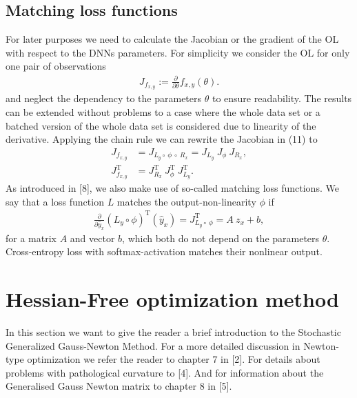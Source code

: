 \documentclass[conference]{IEEEtran}
\begin{document}
	\subsection{Matching loss functions}
	For later purposes we need to calculate the Jacobian or the gradient of the OL with respect to the DNNs parameters. For simplicity we consider the OL for only one pair of observations
	\begin{align}
	J_{f_{x, y}} := \frac{\partial}{\partial\theta}f_{x, y}(\theta).
	\end{align}
	and neglect the dependency to the parameters $\theta$ to ensure readability.
	The results can be extended without problems to a case where the whole data set or a batched version of the whole data set is considered due to linearity of the derivative.
	Applying the chain rule we can rewrite the Jacobian in (11) to
	\begin{align}
	J_{f_{x, y}} &= J_{L_{y}\circ \:\phi \:\circ\:R_{x}} = J_{L_{y}} \: J_{\phi} \: J_{R_{x}},\\
	J_{f_{x, y}}^{\mathrm{T}} &= J_{R_{x}}^{\mathrm{T}} \: J_{\phi}^{\mathrm{T}} \: J_{L_{y}}^{\mathrm{T}}.
	\end{align}
	As introduced in [8], we also make use of so-called matching loss functions. We say that a loss function $L$ matches the output-non-linearity $\phi$ if
	\begin{align}
	\frac{\partial}{\partial\hat{y}_{x}}\left(L_{y}\circ \phi\right)^{\mathrm{T}}(\hat{y}_{x})= J_{L_{y}\circ \:\phi}^{\mathrm{T}} = A\: z_{x} + b,
	\end{align}
	for a matrix $A$ and vector $b$, which both do not depend on the parameters $\theta$.
	Cross-entropy loss with softmax-activation matches their nonlinear output. 
	
	
	\section{Hessian-Free optimization method}
	In this section we want to give the reader a brief introduction to the Stochastic Generalized Gauss-Newton Method. For a more detailed discussion in Newton-type optimization we refer the reader to chapter 7 in [2]. For details about problems with pathological curvature to [4]. And for information about the Generalised Gauss Newton matrix to chapter 8 in [5].
	
\end{document}

